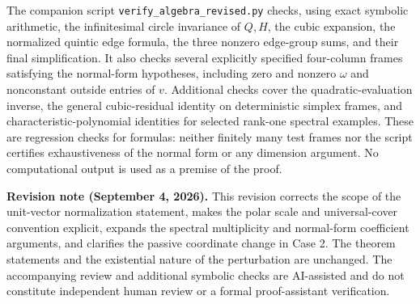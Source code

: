 \documentclass[11pt,reqno]{amsart}
\theoremstyle{definition}
\theoremstyle{remark}
\numberwithin{equation}{section}
\begin{document}
The companion script \texttt{verify\_algebra\_revised.py} checks, using exact
symbolic arithmetic, the infinitesimal circle invariance of $Q,H$,
the cubic expansion, the normalized quintic edge formula, the
three nonzero edge-group sums, and their final simplification.
It also checks several explicitly specified four-column frames
satisfying the normal-form hypotheses, including zero and nonzero
$\omega$ and nonconstant outside entries of $v$. Additional checks cover
the quadratic-evaluation inverse, the general cubic-residual identity
on deterministic simplex frames, and characteristic-polynomial
identities for selected rank-one spectral examples. These are regression
checks for formulas: neither finitely many test frames nor the script
certifies exhaustiveness of the normal form or any dimension
argument. No computational output is used as a premise of the
proof.

\medskip
\noindent\textbf{Revision note (September 4, 2026).}
This revision corrects the scope of the unit-vector normalization statement,
makes the polar scale and universal-cover convention explicit, expands the
spectral multiplicity and normal-form coefficient arguments, and clarifies
the passive coordinate change in Case 2. The theorem statements and the
existential nature of the perturbation are unchanged. The accompanying
review and additional symbolic checks are AI-assisted and do not constitute
independent human review or a formal proof-assistant verification.
\end{document}
